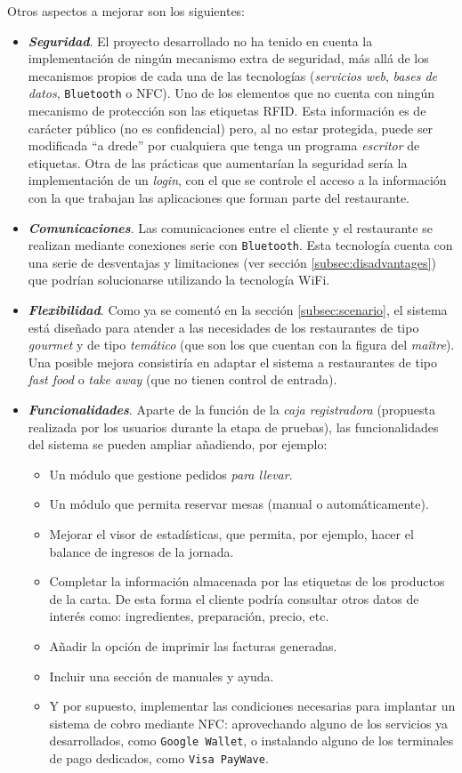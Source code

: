 Otros aspectos a mejorar son los siguientes:
\begin{itemize}
\item \emph{\textbf{Seguridad}}. El proyecto desarrollado no ha tenido en 
cuenta la implementación de ningún mecanismo extra de seguridad, más allá de 
los mecanismos propios de cada una de las tecnologías (\emph{servicios web},
\emph{bases de datos}, \texttt{Bluetooth} o \acs{NFC}). Uno de los elementos
que no cuenta con ningún mecanismo de protección son las etiquetas
\acs{RFID}. Esta información es de carácter público (no es confidencial) pero, 
al no estar protegida, puede ser modificada ``a drede'' por cualquiera que 
tenga un programa \emph{escritor} de etiquetas. Otra de las prácticas que
aumentarían la seguridad sería la implementación de un \emph{login}, con el
que se controle el acceso a la información con la que trabajan las aplicaciones
que forman parte del restaurante.
\item \emph{\textbf{Comunicaciones}}. Las comunicaciones entre el cliente y el
restaurante se realizan mediante conexiones serie con \texttt{Bluetooth}.
Esta tecnología cuenta con una serie de desventajas y limitaciones (ver sección
\ref{subsec:disadvantages}) que podrían solucionarse utilizando la tecnología
\acs{WiFi}.
\item \emph{\textbf{Flexibilidad}}. Como ya se comentó en la sección
\ref{subsec:scenario}, el sistema está diseñado para atender a las necesidades
de los restaurantes de tipo \emph{gourmet} y de tipo \emph{temático} (que
son los que cuentan con la figura del \emph{maître}). Una posible mejora
consistiría en adaptar el sistema a restaurantes de tipo \emph{fast food} o
\emph{take away} (que no tienen control de entrada).
\item \emph{\textbf{Funcionalidades}}. Aparte de la función de la \emph{caja 
registradora} (propuesta realizada por los usuarios durante la etapa de
pruebas), las funcionalidades del sistema se pueden ampliar añadiendo, por
ejemplo:
\begin{itemize}
\item Un módulo que gestione pedidos \emph{para llevar}.
\item Un módulo que permita reservar mesas (manual o automáticamente).
\item Mejorar el visor de estadísticas, que permita, por ejemplo, hacer el 
balance de ingresos de la jornada.
\item Completar la información almacenada por las etiquetas de los productos 
de la carta. De esta forma el cliente podría consultar otros datos de interés 
como: ingredientes, preparación, precio, etc.
\item Añadir la opción de imprimir las facturas generadas.
\item Incluir una sección de manuales y ayuda.
\item Y por supuesto, implementar las condiciones necesarias para implantar
un sistema de cobro mediante \acs{NFC}: aprovechando alguno de los
servicios ya desarrollados, como \texttt{Google Wallet}, o instalando alguno
de los terminales de pago dedicados, como \texttt{Visa PayWave}.
\end{itemize}
\end{itemize}

